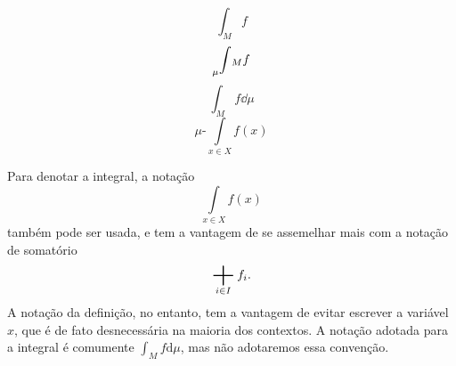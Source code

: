 \begin{equation*}
\int_M f
\end{equation*}
\begin{equation*}
\prescript{}{\mu}\int_M f
\end{equation*}
\begin{equation*}
\int_M f \dd \mu
\end{equation*}
\begin{equation*}
\mu\text{-}\int\limits_{x \in X} f(x)
\end{equation*}




Para denotar a integral, a notação
	\begin{equation*}
	\int\limits_{x \in X} f(x)
	\end{equation*}
também pode ser usada, e tem a vantagem de se assemelhar mais com a notação de somatório
	\begin{equation*}
	\bigplus_{i \in I} f_i.
	\end{equation*}
A notação da definição, no entanto, tem a vantagem de evitar escrever a variável $x$, que é de fato desnecessária na maioria dos contextos. A notação adotada para a integral é comumente $\int_M f \mathrm{d}\mu$, mas não adotaremos essa convenção.

